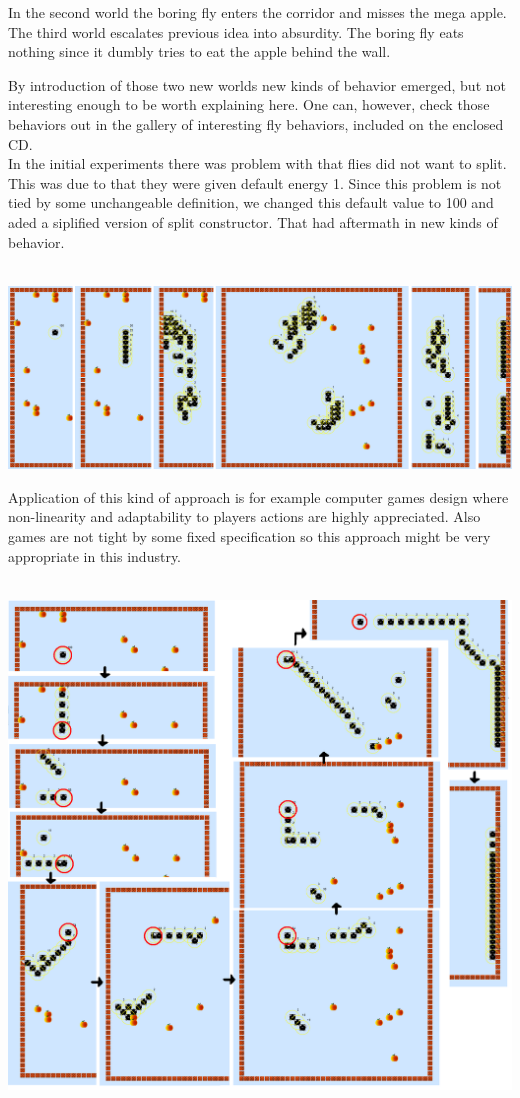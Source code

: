 \documentclass[12pt,a4paper]{report}
\begin{document}
In the second world the boring fly enters the corridor
and misses the mega apple.
The third world escalates previous idea into absurdity.
The boring fly eats nothing since it dumbly tries to eat the
apple behind the wall.

By introduction of those two new worlds new kinds of behavior emerged,
but not interesting enough to be worth explaining here. One can,
however, check those behaviors out in the gallery of interesting fly 
behaviors, included on the enclosed CD.\\

In the initial experiments there was problem with that flies did not
want to split. This was due to that they were given default energy 1.
Since this problem is not tied by some unchangeable definition,
we changed this default value to 100 and aded a siplified version of split constructor. That had aftermath in new kinds of behavior.

~\\
\includegraphics[scale=0.33]{fly/4.png}

\newpage

Application of this kind of approach is for example 
computer games design where non-linearity and adaptability
to players actions are highly appreciated. 
Also games are not tight by some fixed specification
so this approach might be very appropriate in this industry.  

~\\[1em]

\includegraphics[scale=0.35]{fly/5.png}
\end{document}
